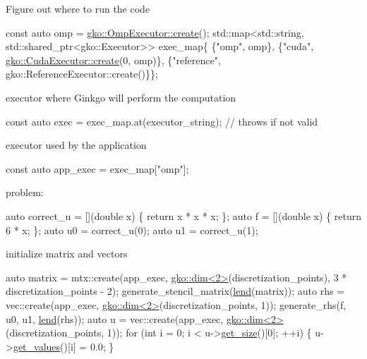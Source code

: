 Figure out where to run the code


\begin{DoxyCode}
\textcolor{keyword}{const} \textcolor{keyword}{auto} omp = \hyperlink{classgko_1_1OmpExecutor_a33ca05fdd0fc928ee262fc9425304874}{gko::OmpExecutor::create}();
std::map<std::string, std::shared\_ptr<gko::Executor>> exec\_map\{
    \{\textcolor{stringliteral}{"omp"}, omp\},
    \{\textcolor{stringliteral}{"cuda"}, \hyperlink{classgko_1_1CudaExecutor_a2718a92034350650ef406ffdb60db090}{gko::CudaExecutor::create}(0, omp)\},
    \{\textcolor{stringliteral}{"reference"}, gko::ReferenceExecutor::create()\}\};
\end{DoxyCode}


executor where Ginkgo will perform the computation


\begin{DoxyCode}
\textcolor{keyword}{const} \textcolor{keyword}{auto} exec = exec\_map.at(executor\_string);  \textcolor{comment}{// throws if not valid}
\end{DoxyCode}


executor used by the application


\begin{DoxyCode}
\textcolor{keyword}{const} \textcolor{keyword}{auto} app\_exec = exec\_map[\textcolor{stringliteral}{"omp"}];
\end{DoxyCode}


problem\+:


\begin{DoxyCode}
\textcolor{keyword}{auto} correct\_u = [](\textcolor{keywordtype}{double} x) \{ \textcolor{keywordflow}{return} x * x * x; \};
\textcolor{keyword}{auto} f = [](\textcolor{keywordtype}{double} x) \{ \textcolor{keywordflow}{return} 6 * x; \};
\textcolor{keyword}{auto} u0 = correct\_u(0);
\textcolor{keyword}{auto} u1 = correct\_u(1);
\end{DoxyCode}


initialize matrix and vectors


\begin{DoxyCode}
\textcolor{keyword}{auto} matrix = mtx::create(app\_exec, \hyperlink{structgko_1_1dim}{gko::dim<2>}(discretization\_points),
                          3 * discretization\_points - 2);
generate\_stencil\_matrix(\hyperlink{namespacegko_aa8cb4876b72e5e1036ea9575443c439b}{lend}(matrix));
\textcolor{keyword}{auto} rhs = vec::create(app\_exec, \hyperlink{structgko_1_1dim}{gko::dim<2>}(discretization\_points, 1));
generate\_rhs(f, u0, u1, \hyperlink{namespacegko_aa8cb4876b72e5e1036ea9575443c439b}{lend}(rhs));
\textcolor{keyword}{auto} u = vec::create(app\_exec, \hyperlink{structgko_1_1dim}{gko::dim<2>}(discretization\_points, 1));
\textcolor{keywordflow}{for} (\textcolor{keywordtype}{int} i = 0; i < u->\hyperlink{classgko_1_1LinOp_a31b3c003388eb0b95393154f68c2b98d}{get\_size}()[0]; ++i) \{
    u->\hyperlink{classgko_1_1matrix_1_1Dense_a3bc458e02fab8e4c9f60f70bd4d5a4f9}{get\_values}()[i] = 0.0;
\}
\end{DoxyCode}


